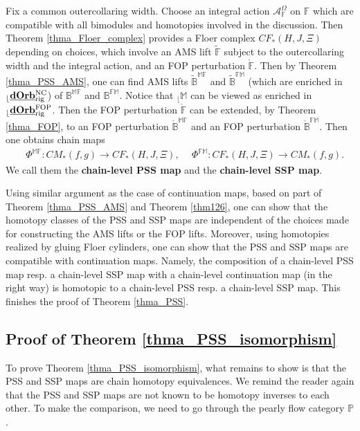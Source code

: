 \documentclass[reqno, 10pt]{amsart}
\numberwithin{equation}{section}
\numberwithin{equation}{section}
\theoremstyle{definition}
\theoremstyle{remark}
\newcommand{\mb}{\mathbb}
\newcommand{\mc}{\mathcal}
\renewcommand{\outer}{{}_{\lfloor}}
\newcommand{\uds}[1]{\underline{\smash{#1}}}
\begin{document}
Fix a common outercollaring width. Choose an integral action ${\mc A}_{\mb F}^\Omega$ on ${\mb F}$ which are compatible with all bimodules and homotopies involved in the discussion. Then Theorem \ref{thma_Floer_complex} provides a Floer complex $CF_*(H, J, \Xi)$ depending on choices, which involve an AMS lift $\tilde {\mb F}$ subject to the outercollaring width and the integral action, and an FOP perturbation $\mathring {\mb F}$. Then by Theorem \ref{thma_PSS_AMS}, one can find AMS lifts $\tilde {\mb B}^{\mb{MF}}$ and $\tilde{\mb B}^{\mb{FM}}$ (which are enriched in $\outer\uds{\bf dOrb}^{\rm NC}_{\rm rig}$) of $\mb{B}^{\mb{MF}}$ and $\mb{B}^{\mb{FM}}$. Notice that $\outer {\mb M}$ can be viewed as enriched in $\outer \uds{\bf dOrb}_{\rm rig}^{\rm FOP}$. Then the FOP perturbation $\mathring {\mb F}$ can be extended, by Theorem \ref{thma_FOP}, to an FOP perturbation $\mathring {\mb B}^{\mb{MF}}$ and an FOP perturbation $\mathring {\mb B}^{\mb{FM}}$. Then one obtains chain maps
\begin{align*}
&\ \Phi^{\mb{MF}}: CM_*(f, g)  \to CF_*(H, J,  \Xi),\ &\ \Phi^{\mb{FM}}:  CF_*(H, J, \Xi) \to CM_*(f, g).
\end{align*}
We call them the {\bf chain-level PSS map} and the {\bf chain-level SSP map}. 

Using similar argument as the case of continuation maps, based on part of Theorem \ref{thma_PSS_AMS} and Theorem \ref{thm126}, one can show that the homotopy classes of the PSS and SSP maps are independent of the choices made for constructing the AMS lifts or the FOP lifts. Moreover, using homotopies realized by gluing Floer cylinders, one can show that the PSS and SSP maps are compatible with continuation maps. Namely, the composition of a chain-level PSS map resp. a chain-level SSP map with a chain-level continuation map (in the right way) is homotopic to a chain-level PSS resp. a chain-level SSP map. This finishes the proof of Theorem \ref{thma_PSS}.

\subsection{Proof of Theorem \ref{thma_PSS_isomorphism}}

To prove Theorem \ref{thma_PSS_isomorphism}, what remains to show is that the PSS and SSP maps are chain homotopy equivalences. We remind the reader again that the PSS and SSP maps are not known to be homotopy inverses to each other. To make the comparison, we need to go through the pearly flow category $\mb{P}$. 
\end{document}

